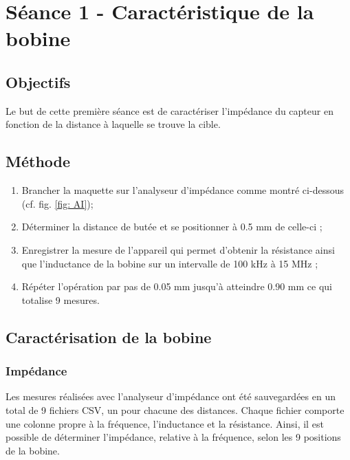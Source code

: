 

\section{Séance 1 - Caractéristique de la bobine }

\subsection{Objectifs}

Le but de cette première séance est de caractériser l'impédance du capteur en fonction de la distance
à laquelle se trouve la cible.


\subsection{Méthode}

\begin{enumerate}
    \item Brancher la maquette sur l'analyseur d'impédance comme montré ci-dessous (cf. fig. \ref{fig: AI});
    \item Déterminer la distance de butée et se positionner à 0.5 mm de celle-ci ;
    \item Enregistrer la mesure de l'appareil qui permet d'obtenir la résistance ainsi que l'inductance de 
    la bobine sur un intervalle de 100 kHz à 15 MHz ;
    \item Répéter l'opération par pas de 0.05 mm jusqu'à atteindre 0.90 mm ce qui totalise 9 mesures.
\end{enumerate}


\subsection{Caractérisation de la bobine}

\subsubsection{Impédance}


Les mesures réalisées avec l'analyseur d'impédance ont été sauvegardées en un total
de 9 fichiers CSV, un pour chacune des distances. Chaque fichier comporte une colonne propre à
la fréquence, l'inductance et la résistance. Ainsi, il est possible de déterminer l'impédance, relative
à la fréquence, selon les 9 positions de la bobine.\\


